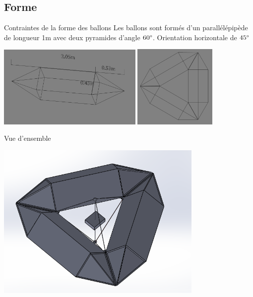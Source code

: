 \subsection{Forme}

\begin{frame}{Contraintes de la forme des ballons}
  Les ballons sont formés d'un parallélépipède de longueur 1m avec deux pyramides d'angle $60\degree$. Orientation horizontale de $45\degree$ \\
  \begin{center}
    \includegraphics[width=7cm]{../Images/ballon.png}
    \includegraphics[width=4cm]{../Images/ballon3.png}
  \end{center}
\end{frame}

\begin{frame}{Vue d'ensemble}
 \begin{center}
		\includegraphics[width=10cm]{../Images/structure1_0.PNG}
 \end{center}
\end{frame}

